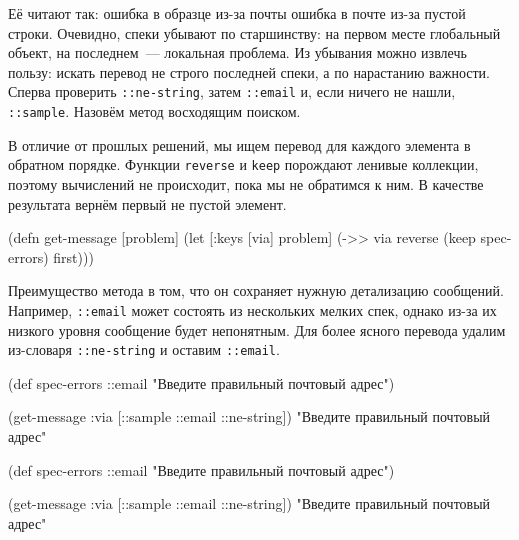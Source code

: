 Её читают так: ошибка в образце из-за почты \arr{} ошибка в почте из-за
пустой строки. Очевидно, спеки убывают по старшинству: на первом месте
глобальный объект, на последнем~--- локальная проблема. Из убывания можно
извлечь пользу: искать перевод не строго последней спеки, а по нарастанию
важности. Сперва проверить \verb|::ne-string|, затем \verb|::email| и, если
ничего не нашли, \verb|::sample|. Назовём метод восходящим поиском.


В отличие от прошлых решений, мы ищем перевод для каждого элемента в обратном
порядке. Функции \verb|reverse| и \verb|keep| порождают ленивые коллекции,
поэтому вычислений не происходит, пока мы не обратимся к ним. В качестве
результата вернём первый не пустой элемент.

\begin{english}
  \begin{clojure}
(defn get-message
  [problem]
  (let [{:keys [via]} problem]
    (->> via
         reverse
         (keep spec-errors)
         first)))
  \end{clojure}
\end{english}

Преимущество метода в том, что он сохраняет нужную детализацию
сообщений. Например, \verb|::email| может состоять из нескольких мелких спек,
однако из-за их низкого уровня сообщение будет непонятным. Для более ясного
перевода удалим из-словаря \verb|::ne-string| и оставим \verb|::email|.

\ifx\devicetype\mobile

  \begin{clojure}
(def spec-errors
  {::email
   "Введите правильный почтовый адрес"})

(get-message
  {:via [::sample ::email ::ne-string]})
"Введите правильный почтовый адрес"
  \end{clojure}

\else

  \begin{clojure}
(def spec-errors
  {::email "Введите правильный почтовый адрес"})

(get-message {:via [::sample ::email ::ne-string]})
"Введите правильный почтовый адрес"
  \end{clojure}


